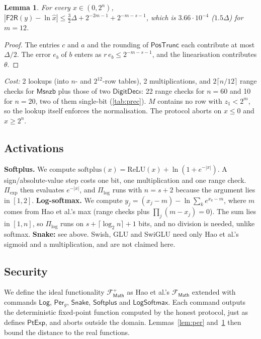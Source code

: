 \documentclass[10pt,twocolumn]{article}
\newtheorem{lemma}{Lemma}
\theoremstyle{remark}
\newcommand{\FtoR}{\mathsf{F2R}}
\newcommand{\DD}{\mathsf{DigitDec}}
\newcommand{\PTrunc}{\mathsf{PosTrunc}}
\newcommand{\Msnzb}{\mathsf{Msnzb}}
\newcommand{\ulp}{\Delta}
\begin{document}
\begin{lemma}\label{lem:log}
For every $x\in(0,2^n)$, $|\FtoR(y)-\ln\hat x|\le\tfrac32\ulp+2^{-2m-1}+2^{-m-s-1}$, which is
$3.66\cdot10^{-4}$ ($1.5\ulp$) for $m=12$.
\end{lemma}
\begin{proof}
The entries $c$ and $a$ and the rounding of $\PTrunc$ each contribute at most $\ulp/2$. The error
$e_b$ of $b$ enters as $r\,e_b\le2^{-m-s-1}$, and the linearisation contributes $\theta$.
\end{proof}
\noindent\emph{Cost:} 2 lookups (into $n$- and $2^{12}$-row tables), 2 multiplications, and
$2\lceil n/12\rceil$ range checks for $\Msnzb$ plus those of two $\DD$s: 22 range checks for
$n=60$ and 10 for $n=20$, two of them single-bit (\cref{tab:prec}). $M$ contains no row with $z_1<2^m$, so the lookup
itself enforces the normalisation. The protocol aborts on $x\le0$ and $x\ge2^n$.

\subsection{Activations}
\textbf{Softplus.} We compute $\mathrm{softplus}(x)=\mathrm{ReLU}(x)+\ln(1+e^{-|x|})$. A
sign/absolute-value step costs one bit, one multiplication and one range check. $\Pi_{\exp}$ then
evaluates $e^{-|x|}$, and $\Pi_{\log}$ runs with $n=s+2$ because the argument lies in $[1,2]$.
\textbf{Log-softmax.} We compute $y_j=(x_j-m)-\ln\sum_ke^{x_k-m}$, where $m$ comes from Hao et al.'s
max (range checks plus $\prod_j(m-x_j)=0$). The sum lies in $[1,n]$, so $\Pi_{\log}$ runs on
$s+\lceil\log_2n\rceil+1$ bits, and no division is needed, unlike softmax.
\textbf{Snake:} see above. Swish, GLU and SwiGLU need only Hao et al.'s sigmoid and a
multiplication, and are not claimed here.

\subsection{Security}
We define the ideal functionality $\mathcal{F}^{+}_{\mathsf{Math}}$ as Hao et al.'s
$\mathcal{F}_{\mathsf{Math}}$ extended with commands $\mathsf{Log}$, $\mathsf{Per}_g$, $\mathsf{Snake}$,
$\mathsf{Softplus}$ and $\mathsf{LogSoftmax}$. Each command outputs the deterministic fixed-point
function computed by the honest protocol, just as~\cite{hao2024scalable} defines
$\mathsf{PtExp}$, and aborts outside the domain. Lemmas~\ref{lem:per} and~\ref{lem:log} then bound
the distance to the real functions.
\end{document}
